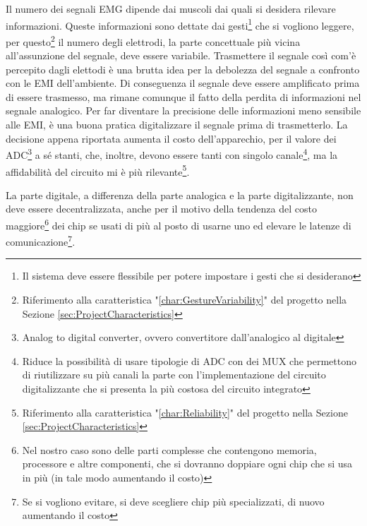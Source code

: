 \documentclass[a4paper, 10pt, final]{article} %
\newcommand{\parenciteit}[2]{\textit{\parencite[#1]{#2}}} %
\begin{document}
    Il numero dei segnali EMG dipende dai muscoli dai quali si desidera rilevare informazioni.
    Queste informazioni sono dettate dai gesti\footnote{Il sistema deve essere flessibile per potere impostare i gesti che si desiderano} che si vogliono leggere, per questo\footnote{Riferimento alla caratteristica "\ref{char:GestureVariability}" del progetto nella Sezione \ref{sec:ProjectCharacteristics}} il numero degli elettrodi, la parte concettuale pi\`{u} vicina all'assunzione del segnale, deve essere variabile.
    Trasmettere il segnale cos\`{i} com'\`{e} percepito dagli elettodi \`{e} una brutta idea per la debolezza del segnale a confronto con le EMI dell'ambiente.
    Di conseguenza il segnale deve essere amplificato prima di essere trasmesso, ma rimane comunque il fatto della perdita di informazioni nel segnale analogico.
    Per far diventare la precisione delle informazioni meno sensibile alle EMI, \`{e} una buona pratica digitalizzare il segnale prima di trasmetterlo.
    La decisione appena riportata aumenta il costo dell'apparechio, per il valore dei ADC\footnote{Analog to digital converter, ovvero convertitore dall'analogico al digitale} a s\'{e} stanti, che, inoltre, devono essere tanti con singolo canale\footnote{Riduce la possibilit\`{a} di usare tipologie di ADC con dei MUX \parenciteit{}{Multiplexer:Wiki} che permettono di riutilizzare su pi\`{u} canali la parte con l'implementazione del circuito digitalizzante che si presenta la pi\`{u} costosa del circuito integrato}, ma la affidabilit\`{a} del circuito mi \`{e} pi\`{u} rilevante\footnote{Riferimento alla caratteristica "\ref{char:Reliability}" del progetto nella Sezione \ref{sec:ProjectCharacteristics}}.

    La parte digitale, a differenza della parte analogica e la parte digitalizzante, non deve essere decentralizzata, anche per il motivo della tendenza del costo maggiore\footnote{Nel nostro caso sono delle parti complesse che contengono memoria, processore e altre componenti, che si dovranno doppiare ogni chip che si usa in pi\`{u} (in tale modo aumentando il costo)} dei chip se usati di pi\`{u} al posto di usarne uno ed elevare le latenze di comunicazione\footnote{Se si vogliono evitare, si deve scegliere chip pi\`{u} specializzati, di nuovo aumentando il costo}.
\end{document}
